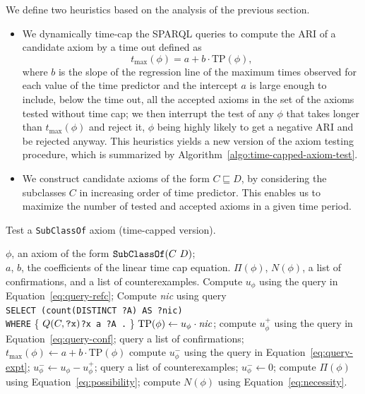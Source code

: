 \documentclass{sig-alternate}
\newcommand{\VAR}[1]{\leavevmode\hbox{\it #1\/}}
\begin{document}
We define two heuristics based on the analysis of the previous section.
\begin{itemize}

\item We dynamically time-cap the SPARQL queries to compute the ARI of a candidate axiom
by a time out defined as
\begin{equation}\label{eq:time-cap}
  t_{\max}(\phi) = a + b\cdot\mathrm{TP}(\phi),
\end{equation}
where $b$ is the slope of the regression line of the maximum times observed
for each value of the time predictor and the intercept $a$ is large enough to include,
below the time out, all the accepted axioms in the set of the axioms tested without time cap;
we then interrupt the test of any $\phi$ that takes longer than $t_{\max}(\phi)$
and reject it, $\phi$ being highly likely to get a negative ARI and be rejected anyway.
This heuristics yields a new version of the axiom testing procedure, which is
summarized by Algorithm~\ref{algo:time-capped-axiom-test}.

\item We construct candidate axioms of the form $C \sqsubseteq D$, by considering
the subclasses $C$ in increasing order of time predictor.
This enables us to maximize the number of tested and accepted axioms in a given time period.

\end{itemize}


\begin{algorithm}
\caption{Test a \texttt{SubClassOf} axiom\hfill\break
  (time-capped version).}\label{algo:time-capped-axiom-test}
\renewcommand{\algorithmicfor}{\textbf{waiting up to}}
\begin{algorithmic}[1]
  \REQUIRE $\phi$, an axiom of the form $\mbox{\tt SubClassOf}(C\ D)$;\\
    $a$, $b$, the coefficients of the linear time cap equation.
  \ENSURE $\Pi(\phi)$, $N(\phi)$, a list of confirmations, and a list of counterexamples.
  \STATE Compute $u_\phi$ using the query in Equation~\ref{eq:query-refc};
  \STATE Compute \VAR{nic} using query\\
    \texttt{SELECT (count(DISTINCT ?A) AS ?nic)}\\
    \texttt{WHERE} \{ $Q(C, \mbox{\tt ?x})$\quad \texttt{?x a ?A .} \}
  \STATE $\mathrm{TP}(\phi) \leftarrow u_\phi \cdot \VAR{nic}$;
  \STATE compute $u^+_\phi$ using the query in Equation~\ref{eq:query-conf};
    \STATE query a list of confirmations;
  \ENDIF
    \STATE $t_{\max}(\phi) \leftarrow a + b\cdot\mathrm{TP}(\phi)$
      \STATE compute $u^-_\phi$ using the query in Equation~\ref{eq:query-expt};\label{line:count-expt}
    \ENDFOR
      \STATE $u^-_\phi \leftarrow u_\phi - u^+_\phi$;
      \STATE query a list of counterexamples;
    \ENDIF
  \ELSE
    \STATE $u^-_\phi \leftarrow 0$;
  \ENDIF
  \STATE compute $\Pi(\phi)$ using Equation~\ref{eq:possibility};
  \STATE compute $N(\phi)$ using Equation~\ref{eq:necessity}.
\end{algorithmic}
\end{algorithm}
\end{document}
